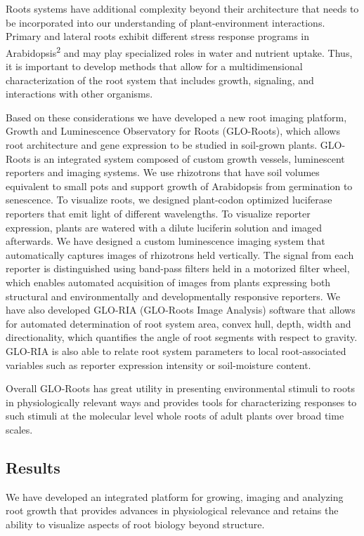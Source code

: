 \documentclass[]{article}
\begin{document}
Roots systems have additional complexity beyond their architecture that
needs to be incorporated into our understanding of plant-environment
interactions. Primary and lateral roots exhibit different stress
response programs in Arabidopsis\textsuperscript{2} and may play
specialized roles in water and nutrient uptake. Thus, it is important to
develop methods that allow for a multidimensional characterization of
the root system that includes growth, signaling, and interactions with
other organisms.

Based on these considerations we have developed a new root imaging
platform, Growth and Luminescence Observatory for Roots (GLO-Roots),
which allows root architecture and gene expression to be studied in
soil-grown plants. GLO-Roots is an integrated system composed of custom
growth vessels, luminescent reporters and imaging systems. We use
rhizotrons that have soil volumes equivalent to small pots and support
growth of Arabidopsis from germination to senescence. To visualize
roots, we designed plant-codon optimized luciferase reporters that emit
light of different wavelengths. To visualize reporter expression, plants
are watered with a dilute luciferin solution and imaged afterwards. We
have designed a custom luminescence imaging system that automatically
captures images of rhizotrons held vertically. The signal from each
reporter is distinguished using band-pass filters held in a motorized
filter wheel, which enables automated acquisition of images from plants
expressing both structural and environmentally and developmentally
responsive reporters. We have also developed GLO-RIA (GLO-Roots Image
Analysis) software that allows for automated determination of root
system area, convex hull, depth, width and directionality, which
quantifies the angle of root segments with respect to gravity. GLO-RIA
is also able to relate root system parameters to local root-associated
variables such as reporter expression intensity or soil-moisture
content.

Overall GLO-Roots has great utility in presenting environmental stimuli
to roots in physiologically relevant ways and provides tools for
characterizing responses to such stimuli at the molecular level whole
roots of adult plants over broad time scales.

\subsection{Results}\label{results}

We have developed an integrated platform for growing, imaging and
analyzing root growth that provides advances in physiological relevance
and retains the ability to visualize aspects of root biology beyond
structure.
\end{document}
